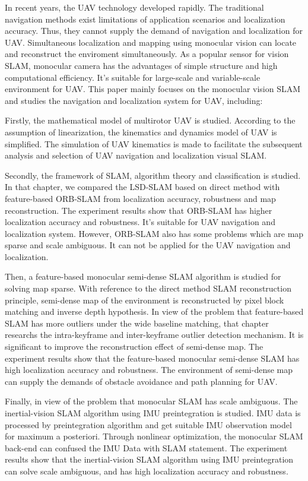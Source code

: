 \begin{englishabstract}
In recent years, the UAV technology developed rapidly. The traditional navigation methods exist limitations of application scenarios and localization accuracy. Thus, they cannot supply the demand of navigation and localization for UAV. Simultaneous localization and mapping using monocular vision can locate and reconstruct the enviroment simultaneously.  
As a popular sensor for vision SLAM, monocular camera has the advantages of simple structure and high computational efficiency. It's suitable for large-scale and variable-scale environment for UAV. This paper mainly focuses on the monocular vision SLAM and studies the navigation and localization system for UAV, including:

Firstly, the mathematical model of multirotor UAV is studied. According to the assumption of linearization, the kinematics and dynamics model of UAV is simplified. The simulation of UAV  kinematics is made to facilitate the subsequent analysis and selection of UAV navigation and localization visual SLAM.

Secondly, the framework of SLAM, algorithm theory and classification is studied. In that chapter, we compared the LSD-SLAM based on direct method with feature-based ORB-SLAM from localization accuracy, robustness and map reconstruction. The experiment results show that ORB-SLAM has higher localization accuracy and robustness. It's suitable for UAV navigation and localization system. However, ORB-SLAM also has some problems which are map sparse and scale ambiguous. It can not be applied for the UAV navigation and localization.

Then, a feature-based monocular semi-dense SLAM algorithm is studied for solving map sparse. With reference to the direct method SLAM reconstruction principle, semi-dense map of the environment is reconstructed by pixel block matching and inverse depth hypothesis. In view of the problem that feature-based SLAM has more outliers under the wide baseline matching, that chapter researchs the intra-keyframe and inter-keyframe outlier detection mechanism. It is significant to improve the reconstruction effect of semi-dense map. The 
experiment results show that the feature-based monocular semi-dense SLAM has high localization accuracy and robustness. The environment of semi-dense map can supply the demands of obstacle avoidance and path planning for UAV.

Finally, in view of the problem that monocular SLAM has scale ambiguous. The inertial-vision SLAM algorithm using IMU preintegration is studied. IMU data is processed by preintegration algorithm and get suitable IMU observation model for maximum a posteriori.  Through nonlinear optimization, the monocular SLAM back-end can confused the IMU Data with SLAM statement. The experiment results show that the inertial-vision SLAM algorithm using IMU preintegration can solve scale ambiguous, and has high localization accuracy and robustness. 
  

\end{englishabstract}
